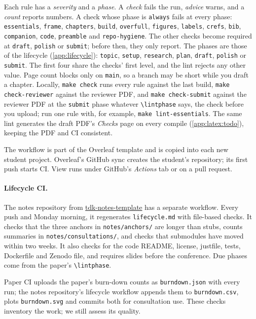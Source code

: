 Each rule has a \emph{severity} and a \emph{phase}. A \emph{check} fails the run, \emph{advice} warns, and a \emph{count} reports numbers. A check whose phase is \texttt{always} fails at every phase: \texttt{essentials}, \texttt{frame}, \texttt{chapters}, \texttt{build}, \texttt{overfull}, \texttt{figures}, \texttt{labels}, \texttt{crefs}, \texttt{bib}, \texttt{companion}, \texttt{code}, \texttt{preamble} and \texttt{repo-hygiene}. The other checks become required at \texttt{draft}, \texttt{polish} or \texttt{submit}; before then, they only report. The phases are those of the lifecycle (\cref{app:lifecycle}): \texttt{topic}, \texttt{setup}, \texttt{research}, \texttt{plan}, \texttt{draft}, \texttt{polish} or \texttt{submit}. The first four share the checks' first level, and the lint rejects any other value. Page count blocks only on \texttt{main}, so a branch may be short while you draft a chapter. Locally, \texttt{make check} runs every rule against the last build, \texttt{make check-reviewer} against the reviewer PDF, and \texttt{make check-submit} against the reviewer PDF at the \texttt{submit} phase whatever \texttt{\textbackslash lintphase} says, the check before you upload; run one rule with, for example, \texttt{make lint-essentials}. The same lint generates the draft PDF's \emph{Checks} page on every compile (\cref{app:latex:todo}), keeping the PDF and CI consistent.

The workflow is part of the Overleaf template and is copied into each new student project. Overleaf's GitHub sync creates the student's repository; its first push starts CI. View runs under GitHub's \emph{Actions} tab or on a pull request.
\paragraph{Lifecycle CI.} The notes repository from \href{https://github.com/BlackLight54/tdk-notes-template}{tdk-notes-template} has a separate workflow. Every push and Monday morning, it regenerates \texttt{lifecycle.md} with file-based checks. It checks that the three anchors in \texttt{notes/anchors/} are longer than stubs, counts summaries in \texttt{notes/consultations/}, and checks that submodules have moved within two weeks. It also checks for the code README, license, justfile, tests, Dockerfile and Zenodo file, and requires slides before the conference. Due phases come from the paper's \texttt{\textbackslash lintphase}.

Paper CI uploads the paper's burn-down counts as \texttt{burndown.json} with every run; the notes repository's lifecycle workflow appends them to \texttt{burndown.csv}, plots \texttt{burndown.svg} and commits both for consultation use. These checks inventory the work; we still assess its quality.

